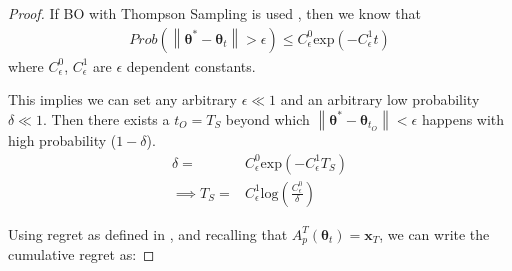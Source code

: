 \documentclass{article}
\begin{document}
\begin{proof}
If BO with Thompson Sampling is used \cite{Basu2017}, then we know that
\begin{align*}
Prob(\left\|\boldsymbol{\theta}^{*}-\boldsymbol{\theta}_{t}\right\|>\epsilon) \leq C^{0}_{\epsilon}\text{exp}(-C^{1}_{\epsilon}t)
\end{align*}
where $C^{0}_{\epsilon}$, $C^{1}_{\epsilon}$ are $\epsilon$ dependent constants.

This implies we can set any arbitrary $\epsilon \ll 1$ and an arbitrary low probability $\delta \ll 1$. Then there exists a $t_{O} = T_{S}$ beyond which $\left\|\boldsymbol{\theta}^{*}-\boldsymbol{\theta}_{t_{O}}\right\| < \epsilon$ happens with high probability ($1 - \delta$).
\begin{align*}
\delta = & C^{0}_{\epsilon}\text{exp}(-C^{1}_{\epsilon}T_{S})\\
\implies T_{S} = & C^{1}_{\epsilon}\text{log}(\frac{C^{0}_{\epsilon}}{\delta})
\end{align*}

Using regret as defined in \cite{Srinivas:2010:GPO:3104322.3104451}, and recalling that $A_{p}^{T}(\boldsymbol{\theta}_{t})=\boldsymbol{x}_{T}$, we can write the cumulative regret as:


\end{proof}
\end{document}
